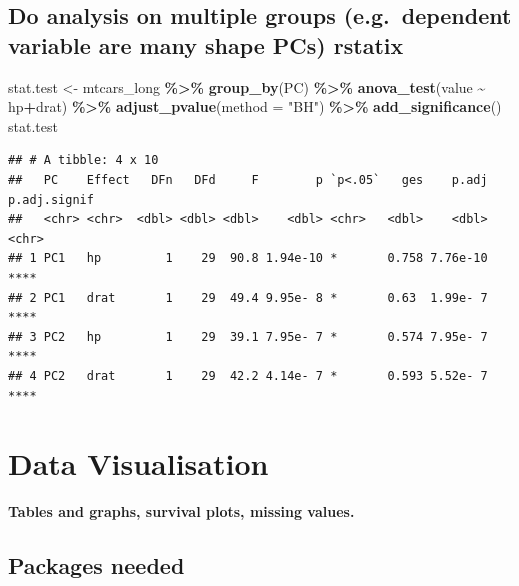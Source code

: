 \documentclass[
]{article}
\newenvironment{Shaded}{\begin{snugshade}}{\end{snugshade}}
\newcommand{\AttributeTok}[1]{\textcolor[rgb]{0.13,0.29,0.53}{#1}}
\newcommand{\FunctionTok}[1]{\textcolor[rgb]{0.13,0.29,0.53}{\textbf{#1}}}
\newcommand{\NormalTok}[1]{#1}
\newcommand{\OtherTok}[1]{\textcolor[rgb]{0.56,0.35,0.01}{#1}}
\newcommand{\SpecialCharTok}[1]{\textcolor[rgb]{0.81,0.36,0.00}{\textbf{#1}}}
\newcommand{\StringTok}[1]{\textcolor[rgb]{0.31,0.60,0.02}{#1}}
\begin{document}
\hypertarget{do-analysis-on-multiple-groups-e.g.-dependent-variable-are-many-shape-pcs-rstatix}{%
\subsection{Do analysis on multiple groups (e.g.~dependent variable are many shape PCs) rstatix}\label{do-analysis-on-multiple-groups-e.g.-dependent-variable-are-many-shape-pcs-rstatix}}

\begin{Shaded}
\begin{Highlighting}[]
\NormalTok{stat.test }\OtherTok{\textless{}{-}}\NormalTok{ mtcars\_long }\SpecialCharTok{\%\textgreater{}\%} 
  \FunctionTok{group\_by}\NormalTok{(PC) }\SpecialCharTok{\%\textgreater{}\%}
  \FunctionTok{anova\_test}\NormalTok{(value }\SpecialCharTok{\textasciitilde{}}\NormalTok{ hp}\SpecialCharTok{+}\NormalTok{drat) }\SpecialCharTok{\%\textgreater{}\%}
  \FunctionTok{adjust\_pvalue}\NormalTok{(}\AttributeTok{method =} \StringTok{"BH"}\NormalTok{) }\SpecialCharTok{\%\textgreater{}\%}
  \FunctionTok{add\_significance}\NormalTok{()}
\NormalTok{stat.test}
\end{Highlighting}
\end{Shaded}

\begin{verbatim}
## # A tibble: 4 x 10
##   PC    Effect   DFn   DFd     F        p `p<.05`   ges    p.adj p.adj.signif
##   <chr> <chr>  <dbl> <dbl> <dbl>    <dbl> <chr>   <dbl>    <dbl> <chr>       
## 1 PC1   hp         1    29  90.8 1.94e-10 *       0.758 7.76e-10 ****        
## 2 PC1   drat       1    29  49.4 9.95e- 8 *       0.63  1.99e- 7 ****        
## 3 PC2   hp         1    29  39.1 7.95e- 7 *       0.574 7.95e- 7 ****        
## 4 PC2   drat       1    29  42.2 4.14e- 7 *       0.593 5.52e- 7 ****
\end{verbatim}

\hypertarget{data-visualisation}{%
\section{Data Visualisation}\label{data-visualisation}}

\textbf{Tables and graphs, survival plots, missing values.}

\hypertarget{packages-needed}{%
\subsection{Packages needed}\label{packages-needed}}
\end{document}
